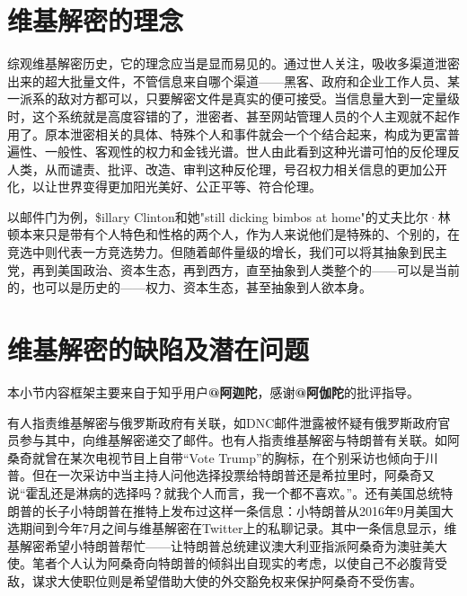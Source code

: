 \section{维基解密的理念}

综观维基解密历史，它的理念应当是显而易见的。通过世人关注，吸收多渠道泄密出来的超大批量文件，不管信息来自哪个渠道——黑客、政府和企业工作人员、某一派系的敌对方都可以，只要解密文件是真实的便可接受。当信息量大到一定量级时，这个系统就是高度容错的了，泄密者、甚至网站管理人员的个人主观就不起作用了。原本泄密相关的具体、特殊个人和事件就会一个个结合起来，构成为更富普遍性、一般性、客观性的权力和金钱光谱。世人由此看到这种光谱可怕的反伦理反人类，从而谴责、批评、改造、审判这种反伦理，号召权力相关信息的更加公开化，以让世界变得更加阳光美好、公正平等、符合伦理。

以邮件门为例，\$illary Clinton和她"still dicking bimbos at home"的丈夫比尔·林顿本来只是带有个人特色和性格的两个人，作为人来说他们是特殊的、个别的，在竞选中则代表一方竞选势力。但随着邮件量级的增长，我们可以将其抽象到民主党，再到美国政治、资本生态，再到西方，直至抽象到人类整个的——可以是当前的，也可以是历史的——权力、资本生态，甚至抽象到人欲本身。

\section{维基解密的缺陷及潜在问题}

本小节内容框架主要来自于知乎用户\textbf{@阿迦陀}，感谢\textbf{@阿伽陀}的批评指导。

有人指责维基解密与俄罗斯政府有关联，如DNC邮件泄露被怀疑有俄罗斯政府官员参与其中，向维基解密递交了邮件。也有人指责维基解密与特朗普有关联。如阿桑奇就曾在某次电视节目上自带“Vote Trump”的胸标，在个别采访也倾向于川普。但在一次采访中当主持人问他选择投票给特朗普还是希拉里时，阿桑奇又说“霍乱还是淋病的选择吗？就我个人而言，我一个都不喜欢。”。还有美国总统特朗普的长子小特朗普在推特上发布过这样一条信息：小特朗普从2016年9月美国大选期间到今年7月之间与维基解密在Twitter上的私聊记录。其中一条信息显示，维基解密希望小特朗普帮忙——让特朗普总统建议澳大利亚指派阿桑奇为澳驻美大使。笔者个人认为阿桑奇向特朗普的倾斜出自现实的考虑，以使自己不必腹背受敌，谋求大使职位则是希望借助大使的外交豁免权来保护阿桑奇不受伤害。

